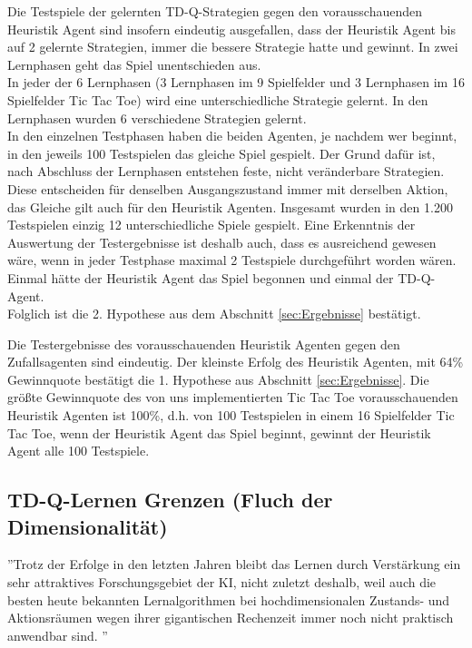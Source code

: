 
Die Testspiele der gelernten TD-Q-Strategien gegen den vorausschauenden Heuristik Agent sind insofern eindeutig ausgefallen, dass der Heuristik Agent bis auf 2 gelernte Strategien, immer die bessere Strategie hatte und gewinnt. In zwei Lernphasen geht das Spiel unentschieden aus. \\

In jeder der 6 Lernphasen (3 Lernphasen im 9 Spielfelder und 3 Lernphasen im 16 Spielfelder Tic Tac Toe) wird eine unterschiedliche Strategie gelernt. In den Lernphasen wurden 6 verschiedene Strategien gelernt. \\

In den einzelnen Testphasen haben die beiden Agenten, je nachdem wer beginnt, in den jeweils 100 Testspielen das gleiche Spiel gespielt. Der Grund dafür ist, nach Abschluss der Lernphasen entstehen feste, nicht veränderbare Strategien. Diese entscheiden für denselben Ausgangszustand immer mit derselben Aktion, das Gleiche gilt auch für den Heuristik Agenten. Insgesamt wurden in den 1.200 Testspielen einzig 12 unterschiedliche Spiele gespielt. Eine Erkenntnis der Auswertung der Testergebnisse ist deshalb auch, dass es  ausreichend gewesen wäre, wenn in jeder Testphase maximal 2 Testspiele durchgeführt worden wären. Einmal hätte der Heuristik Agent das Spiel begonnen und einmal der TD-Q-Agent. \\ 

Folglich ist die 2. Hypothese aus dem Abschnitt \ref{sec:Ergebnisse} bestätigt. \\


Die Testergebnisse des vorausschauenden Heuristik Agenten gegen den Zufallsagenten sind eindeutig. Der kleinste Erfolg des Heuristik Agenten, mit 64\% Gewinnquote bestätigt die 1. Hypothese aus Abschnitt \ref{sec:Ergebnisse}. Die größte Gewinnquote des von uns implementierten Tic Tac Toe vorausschauenden Heuristik Agenten ist 100\%, d.h. von 100 Testspielen in einem 16 Spielfelder Tic Tac Toe, wenn der Heuristik Agent das Spiel beginnt, gewinnt der Heuristik Agent alle 100 Testspiele. \\

\subsection{TD-Q-Lernen Grenzen (Fluch der Dimensionalität)}
\label{subsec:TD-Q-Lernen Grenzen}
''Trotz der Erfolge in den letzten Jahren bleibt das Lernen durch Verstärkung ein sehr attraktives Forschungsgebiet der KI, nicht zuletzt deshalb, weil auch die besten heute bekannten Lernalgorithmen bei hochdimensionalen Zustands- und Aktionsräumen wegen ihrer gigantischen Rechenzeit immer noch nicht praktisch anwendbar sind. \cite[305]{Ertel}''\\

